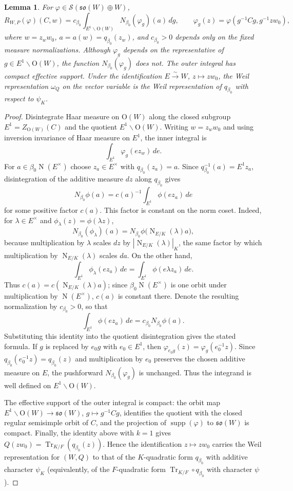 \documentclass[11pt,oneside,notitlepage]{book}
\numberwithin{equation}{section}
\theoremstyle{plain}
\newtheorem{lemma}[theorem]{Lemma}
\theoremstyle{definition}
\newcommand{\Ort}{\mathrm{O}}
\newcommand{\so}{\mathfrak{so}}
\newcommand{\cS}{\mathcal{S}}
\newcommand{\Tr}{\operatorname{Tr}}
\newcommand{\N}{\operatorname{N}}
\begin{document}
\begin{lemma}\label{lem:even-orth}
	For $\varphi\in\cS(\so(W)\oplus W)$,
	\[
	R_{W,P}(\varphi)(C,w)
	=c_{\beta_0}\int_{E^1\backslash\Ort(W)}
	N_{\beta_0}(\varphi_g)(a)\,d\dot g,
	\qquad
	\varphi_g(z)=\varphi(g^{-1}Cg,g^{-1}zw_0),
	\]
	where $w=z_w w_0$, $a=a(w)=q_{\beta_0}(z_w)$, and $c_{\beta_0}>0$ depends only on the fixed measure normalizations. Although $\varphi_g$ depends on the representative of $g\in E^1\backslash\Ort(W)$, the function $N_{\beta_0}(\varphi_g)$ does not. The outer integral has compact effective support. Under the identification $E\xrightarrow{\sim}W$, $z\mapsto zw_0$, the Weil representation $\omega_Q$ on the vector variable is the Weil representation of $q_{\beta_0}$ with respect to $\psi_K$.
\end{lemma}
\begin{proof}
	Disintegrate Haar measure on $\Ort(W)$ along the closed subgroup
	$E^1=Z_{\Ort(W)}(C)$ and the quotient $E^1\backslash\Ort(W)$. Writing
	$w=z_w w_0$ and using inversion invariance of Haar measure on $E^1$, the inner integral is
	\[
	\int_{E^1}\varphi_g(ez_w)\,de.
	\]
	For $a\in\beta_0\N(E^\times)$ choose $z_a\in E^\times$ with
	$q_{\beta_0}(z_a)=a$. Since
	$q_{\beta_0}^{-1}(a)=E^1z_a$, disintegration of the additive measure $dz$ along $q_{\beta_0}$ gives
	\[
	N_{\beta_0}\phi(a)
	=c(a)^{-1}\int_{E^1}\phi(ez_a)\,de
	\]
	for some positive factor $c(a)$. This factor is constant on the norm coset. Indeed, for $\lambda\in E^\times$ and $\phi_\lambda(z)=\phi(\lambda z)$,
	\[
	N_{\beta_0}(\phi_\lambda)(a)
	=N_{\beta_0}\phi\bigl(\N_{E/K}(\lambda)a\bigr),
	\]
	because multiplication by $\lambda$ scales $dz$ by
	$|\N_{E/K}(\lambda)|_K$, the same factor by which multiplication by
	$\N_{E/K}(\lambda)$ scales $da$. On the other hand,
	\[
	\int_{E^1}\phi_\lambda(ez_a)\,de
	=\int_{E^1}\phi(e\lambda z_a)\,de.
	\]
	Thus $c(a)=c(\N_{E/K}(\lambda)a)$; since $\beta_0\N(E^\times)$ is one orbit under multiplication by $\N(E^\times)$, $c(a)$ is constant there. Denote the resulting normalization by $c_{\beta_0}>0$, so that
	\[
	\int_{E^1}\phi(ez_a)\,de
	=c_{\beta_0}N_{\beta_0}\phi(a).
	\]
	Substituting this identity into the quotient disintegration gives the stated formula. If $g$ is replaced by $e_0g$ with $e_0\in E^1$, then $\varphi_{e_0g}(z)=\varphi_g(e_0^{-1}z)$. Since $q_{\beta_0}(e_0^{-1}z)=q_{\beta_0}(z)$ and multiplication by $e_0$ preserves the chosen additive measure on $E$, the pushforward $N_{\beta_0}(\varphi_g)$ is unchanged. Thus the integrand is well defined on $E^1\backslash\Ort(W)$.
	
	The effective support of the outer integral is compact: the orbit map
	$E^1\backslash\Ort(W)\to\so(W)$, $g\mapsto g^{-1}Cg$, identifies the quotient with the closed regular semisimple orbit of $C$, and the projection of $\operatorname{supp}(\varphi)$ to $\so(W)$ is compact. Finally, the identity above with $k=1$ gives
	$Q(zw_0)=\Tr_{K/F}(q_{\beta_0}(z))$. Hence the identification
	$z\mapsto zw_0$ carries the Weil representation for $(W,Q)$ to that of the $K$-quadratic form $q_{\beta_0}$ with additive character $\psi_K$ (equivalently, of the $F$-quadratic form $\Tr_{K/F}\circ q_{\beta_0}$ with character $\psi$).
\end{proof}
\end{document}
